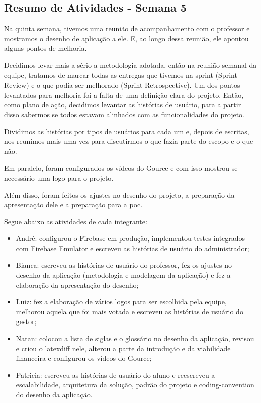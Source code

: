 \begin{apendicesenv}
\section{Resumo de Atividades - Semana 5}
Na quinta semana, tivemos uma reunião de acompanhamento com o professor e mostramos o desenho de aplicação a ele. E, ao longo dessa reunião, ele apontou alguns pontos de melhoria.

Decidimos levar mais a sério a metodologia adotada, então na reunião semanal da equipe, tratamos de marcar todas as entregas que tivemos na \gls{sprint} (Sprint Review) e o que podia ser melhorado (Sprint Retrospective). Um dos pontos levantados para melhoria foi a falta de uma definição clara do projeto. Então, como plano de ação, decidimos levantar as histórias de usuário, para a partir disso sabermos se todos estavam alinhados com as funcionalidades do projeto. 

Dividimos as histórias por tipos de usuários para cada um e, depois de escritas, nos reunimos mais uma vez para discutirmos o que fazia parte do escopo e o que não.

Em paralelo, foram configurados os vídeos do Gource e com isso mostrou-se necessário uma logo para o projeto.

Além disso, foram feitos os ajustes no desenho do projeto, a preparação da apresentação dele e a preparação para a \ac{poc}.

Segue abaixo as atividades de cada integrante:

\begin{itemize}
\item André: configurou o Firebase em produção, implementou testes integrados com Firebase Emulator e escreveu as histórias de usuário do administrador;
\item Bianca: escreveu as histórias de usuário do professor, fez os ajustes no desenho da aplicação (metodologia e modelagem da aplicação) e fez a elaboração da apresentação do desenho;
\item Luiz: fez a elaboração de vários logos para ser escolhida pela equipe, melhorou aquela que foi mais votada e escreveu as histórias de usuário do gestor;
\item Natan: colocou a lista de siglas e o glossário no desenho da aplicação, revisou e criou o latexdiff nele, alterou a parte da introdução e da viabilidade financeira e configurou os vídeos do Gource;
\item Patricia: escreveu as histórias de usuário do aluno e reescreveu a escalabilidade, arquitetura da solução, padrão do projeto e \gls{coding-convention} do desenho da aplicação.
\end{itemize}


\end{apendicesenv}
